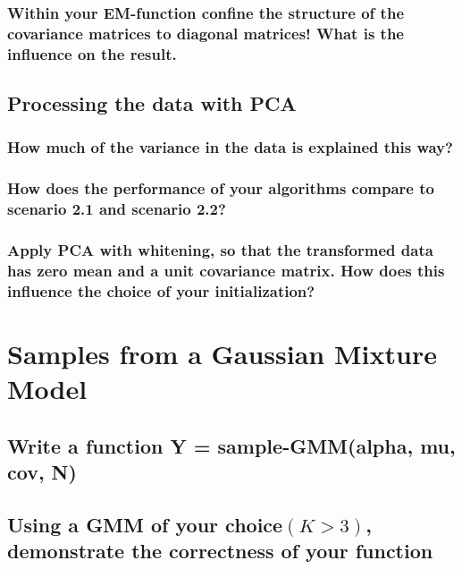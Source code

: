 \documentclass[a4paper]{article}
\begin{document}
	\subsubsection{Within your EM-function conﬁne the structure of the covariance matrices to diagonal matrices! What is the inﬂuence on the result.}
	\subsection{Processing the data with PCA }
	\subsubsection{How much of the variance in the data is explained this way?}
	\subsubsection{How does the performance of your algorithms compare to scenario 2.1 and scenario 2.2?}
	\subsubsection{Apply PCA with whitening, so that the transformed data has zero mean and a unit covariance matrix. How does this inﬂuence the choice of your initialization?}
	
	\section{Samples from a Gaussian Mixture Model}
	\subsection{Write a function Y = sample-GMM(alpha, mu, cov, N)}
	\subsection{Using a GMM of your choice$ (K > 3)$, demonstrate the correctness of your function}
\end{document}
